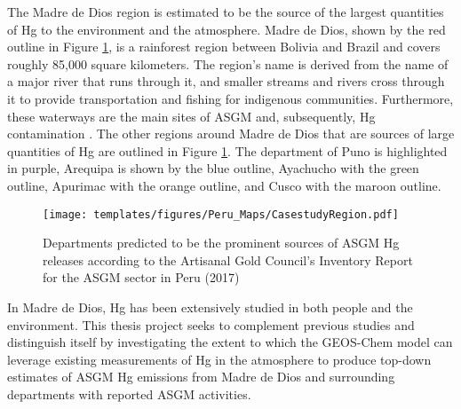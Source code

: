 \begin{flushleft}
The Madre de Dios region is estimated to be the source of the largest quantities of Hg to the environment and the atmosphere\cite{agc_reporte_2017}. Madre de Dios, shown by the red outline in Figure \ref{fig:PeruCS}, is a rainforest region between Bolivia and Brazil and covers roughly 85,000 square kilometers. The region's name is derived from the name of a major river that runs through it, and smaller streams and rivers cross through it to provide transportation and fishing for indigenous communities. Furthermore, these waterways are the main sites of ASGM and, subsequently, Hg contamination \cite{ashe_elevated_2012,agc_reporte_2017}. The other regions around Madre de Dios that are sources of large quantities of Hg are outlined in Figure \ref{fig:PeruCS}. The department of Puno is highlighted in purple, Arequipa is shown by the blue outline, Ayachucho with the green outline, Apurimac with the orange outline, and Cusco with the maroon outline.
\begin{figure}[H]
  \texttt{[image: templates/figures/Peru\_Maps/CasestudyRegion.pdf]}
  \centering
  \caption[Departments predicted to be the prominent sources of ASGM Hg releases in Peru]{Departments predicted to be the prominent sources of ASGM Hg releases according to the Artisanal Gold Council's  Inventory Report for the ASGM sector in Peru (2017)\cite{agc_reporte_2017} }
  \label{fig:PeruCS}
\end{figure}
\FloatBarrier

In Madre de Dios, Hg has been extensively studied in both people and the environment. This thesis project seeks to complement previous studies and distinguish itself  by investigating the extent to which the GEOS-Chem model can leverage existing measurements of Hg in the atmosphere to produce top-down estimates of ASGM Hg emissions from Madre de Dios and surrounding departments with reported ASGM activities.

\end{flushleft}
